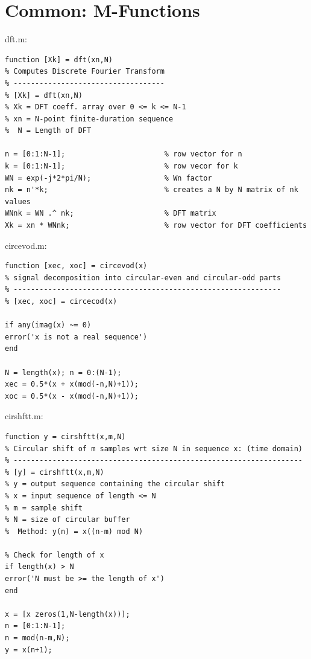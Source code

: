 \documentclass[11pt
  , a4paper
  , article
  , oneside
]{memoir}
\begin{document}
\chapter{Common: M-Functions}
dft.m:
\begin{lstlisting}[style=termstyle]
function [Xk] = dft(xn,N)
% Computes Discrete Fourier Transform
% -----------------------------------
% [Xk] = dft(xn,N)
% Xk = DFT coeff. array over 0 <= k <= N-1
% xn = N-point finite-duration sequence
%  N = Length of DFT

n = [0:1:N-1];                       % row vector for n
k = [0:1:N-1];                       % row vecor for k
WN = exp(-j*2*pi/N);                 % Wn factor
nk = n'*k;                           % creates a N by N matrix of nk values
WNnk = WN .^ nk;                     % DFT matrix
Xk = xn * WNnk;                      % row vector for DFT coefficients
\end{lstlisting}

circevod.m:
\begin{lstlisting}[style=termstyle]
function [xec, xoc] = circevod(x)
% signal decomposition into circular-even and circular-odd parts
% --------------------------------------------------------------
% [xec, xoc] = circecod(x)

if any(imag(x) ~= 0)
error('x is not a real sequence')
end

N = length(x); n = 0:(N-1);
xec = 0.5*(x + x(mod(-n,N)+1));
xoc = 0.5*(x - x(mod(-n,N)+1));
\end{lstlisting}

cirshftt.m:
\begin{lstlisting}[style=termstyle]
function y = cirshftt(x,m,N)
% Circular shift of m samples wrt size N in sequence x: (time domain)
% -------------------------------------------------------------------
% [y] = cirshftt(x,m,N)
% y = output sequence containing the circular shift
% x = input sequence of length <= N
% m = sample shift
% N = size of circular buffer
%  Method: y(n) = x((n-m) mod N)

% Check for length of x
if length(x) > N
error('N must be >= the length of x')
end

x = [x zeros(1,N-length(x))];
n = [0:1:N-1];
n = mod(n-m,N);
y = x(n+1);

\end{lstlisting}
\end{document}
